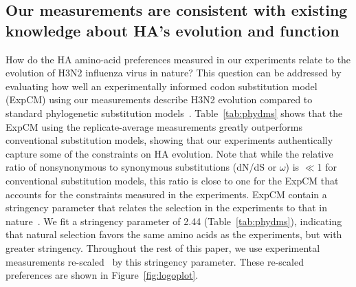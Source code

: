 \documentclass[9pt,twocolumn,twoside]{pnas-new}
\begin{document}
\subsection*{Our measurements are consistent with existing knowledge about HA's evolution and function}
How do the HA amino-acid preferences measured in our experiments relate to the evolution of H3N2 influenza virus in nature?
This question can be addressed by evaluating how well an experimentally informed codon substitution model (ExpCM) using our measurements describe H3N2 evolution compared to standard phylogenetic substitution models~\cite{bloom2017identification,hilton2017phydms}.
Table~\ref{tab:phydms} shows that the ExpCM using the replicate-average measurements greatly outperforms conventional substitution models, showing that our experiments authentically capture some of the constraints on HA evolution. 
Note that while the relative ratio of nonsynonymous to synonymous substitutions (dN/dS or $\omega$) is $\ll$1 for conventional substitution models, this ratio is close to one for the ExpCM that accounts for the constraints measured in the experiments.
ExpCM contain a stringency parameter that relates the selection in the experiments to that in nature~\cite{bloom2017identification,hilton2017phydms}.
We fit a stringency parameter of 2.44 (Table~\ref{tab:phydms}), indicating that natural selection favors the same amino acids as the experiments, but with greater stringency.
Throughout the rest of this paper, we use experimental measurements re-scaled~\cite{bloom2017identification,hilton2017phydms} by this stringency parameter.
These re-scaled preferences are shown in Figure~\ref{fig:logoplot}.
\end{document}

